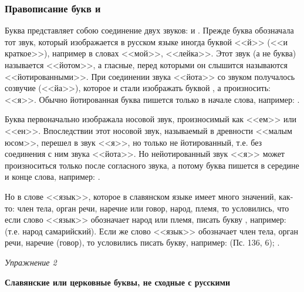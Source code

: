 \documentclass[11pt,a4paper,oneside]{memoir}
\begin{document}
                \subsubsection{Правописание букв {\large{}} и {\large{}}}

    Буква {} представляет собою соединение двух звуков: {} и {}. Прежде буква {} обозначала тот звук, который изображается в русском языке иногда буквой <<й>> (<<и краткое>>), например в словах <<мой>>, <<лейка>>. Этот звук (а не буква) называется <<йотом>>, а гласные, перед которыми он слышится называются <<йотированными>>. При соединении звука <<йота>> со звуком {} получалось созвучие {} (<<йа>>), которое и стали изображать буквой {}, а произносить: <<я>>. Обычно йотированная буква {} пишется только в начале слова, например: {}.
    
    Буква {} первоначально изображала носовой звук, произносимый как <<ем>> или <<ен>>. Впоследствии этот носовой звук, называемый в древности <<малым юсом>>, перешел в звук <<я>>, но только не йотированный, т.е. без соединения с ним звука <<йота>>. Но нейотированный звук <<я>> может произноситься только после согласного звука, а потому буква {} пишется в середине и конце слова, например: {}.
    
    Но в слове <<язык>>, которое в славянском языке имеет много значений, как-то: член тела, орган речи, наречие или говор, народ, племя, то условились, что если слово <<язык>> обозначает народ или племя, писать букву {}, например: {} (т.е. народ самарийский). Если же слово <<язык>> обозначает член тела, орган речи, наречие (говор), то условились писать букву{}, например: {} (Пс. 136, 6); {}.
    
    \begin{flushright}
    \emph{Упражнение 2}
    \end{flushright}
    \medskip
    
    \textbf{Славянские или церковные буквы, не сходные с русскими}
    \medskip
    
\end{document}
